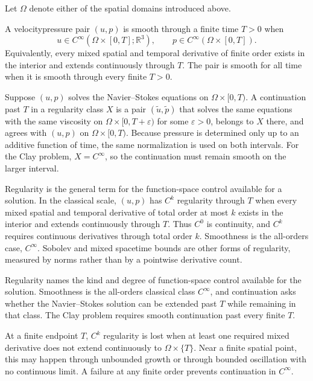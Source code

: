 
Let \(\Omega\) denote either of the spatial domains introduced above.

\begin{definition}[Smoothness]\label{def:Smoothness}
A velocity\textendash pressure pair \((u,p)\) is smooth through a finite time \(T>0\) when
\[
  u\in C^\infty\!\left(\Omega\times[0,T];\mathbb R^3\right),
  \qquad
  p\in C^\infty\!\left(\Omega\times[0,T]\right).
\]
Equivalently, every mixed spatial and temporal derivative of finite order exists in the interior and extends continuously through \(T\).
The pair is smooth for all time when it is smooth through every finite \(T>0\).
\end{definition}

\begin{definition}[Continuation]\label{def:Continuation}
Suppose \((u,p)\) solves the Navier--Stokes equations on \(\Omega\times[0,T)\).
A continuation past \(T\) in a regularity class \(X\) is a pair \((\widetilde u,\widetilde p)\) that solves the same equations with the same viscosity on \(\Omega\times[0,T+\varepsilon)\) for some \(\varepsilon>0\), belongs to \(X\) there, and agrees with \((u,p)\) on \(\Omega\times[0,T)\).
Because pressure is determined only up to an additive function of time, the same normalization is used on both intervals.
For the Clay problem, \(X=C^\infty\), so the continuation must remain smooth on the larger interval.
\end{definition}

\begin{definition}[Regularity]\label{def:Regularity}
Regularity is the general term for the function-space control available for a solution.
In the classical scale, \((u,p)\) has \(C^k\) regularity through \(T\) when every mixed spatial and temporal derivative of total order at most \(k\) exists in the interior and extends continuously through \(T\).
Thus \(C^0\) is continuity, and \(C^k\) requires continuous derivatives through total order \(k\).
Smoothness is the all-orders case, \(C^\infty\).
Sobolev and mixed space\textendash time bounds are other forms of regularity, measured by norms rather than by a pointwise derivative count.
\end{definition}

Regularity names the kind and degree of function-space control available for the solution.
Smoothness is the all-orders classical class \(C^\infty\), and continuation asks whether the Navier--Stokes solution can be extended past \(T\) while remaining in that class.
The Clay problem requires smooth continuation past every finite \(T\).

At a finite endpoint \(T\), \(C^k\) regularity is lost when at least one required mixed derivative does not extend continuously to \(\Omega\times\{T\}\).
Near a finite spatial point, this may happen through unbounded growth or through bounded oscillation with no continuous limit.
A failure at any finite order prevents continuation in \(C^\infty\).
